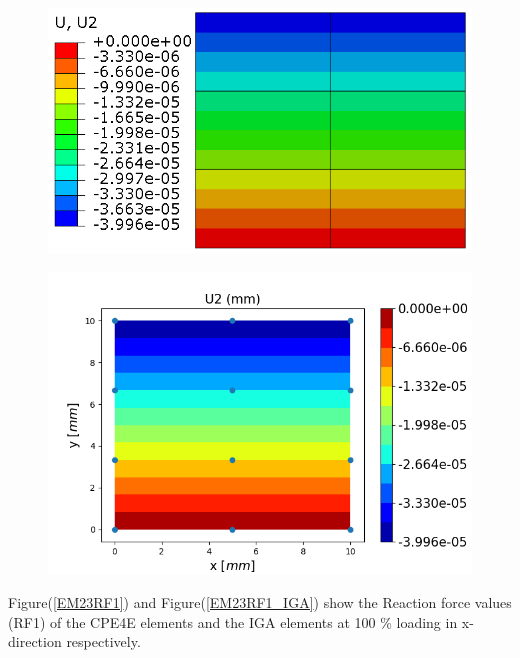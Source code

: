 \documentclass[11pt]{article}
\begin{document}
\begin{figure}[H]
	\centering
	\begin{minipage}{.5\textwidth}
		\centering
		\includegraphics[width=1\linewidth]{EM23U2.png}
		\label{EM23U2}
	\end{minipage}%
	\begin{minipage}{.6\textwidth}
		\centering
		\includegraphics[width=1\linewidth]{EM23U2_IGA.png}
		\label{EM23U2_IGA}
	\end{minipage}
\end{figure}
Figure(\ref{EM23RF1}) and Figure(\ref{EM23RF1_IGA}) show the Reaction force values (RF1) of the CPE4E elements and the IGA elements at 100 \% loading in x-direction respectively. \\
\end{document}
